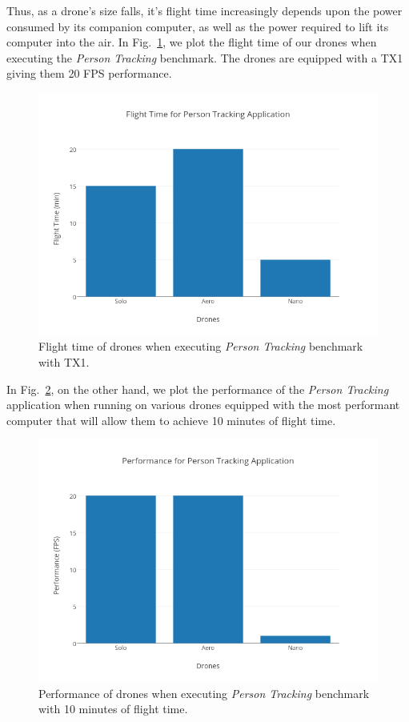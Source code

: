 Thus, as a drone's size falls, it's flight time increasingly depends upon the power consumed by its companion computer, as well as the power required to lift its computer into the air. In Fig.~\ref{fig:flight-time-tracking-tx1}, we plot the flight time of our drones when executing the \textit{Person Tracking} benchmark. The drones are equipped with a TX1 giving them 20 FPS performance.

\begin{figure}[h]
\centering
\includegraphics[width=\linewidth]{figs/flight-time-tracking-tx1}
\caption{Flight time of drones when executing \textit{Person Tracking} benchmark with TX1.}
\label{fig:flight-time-tracking-tx1}
\end{figure}

In Fig.~\ref{fig:perf-tracking-10min}, on the other hand, we plot the performance of the \textit{Person Tracking} application when running on various drones equipped with the most performant computer that will allow them to achieve 10 minutes of flight time.

\begin{figure}[h]
\centering
\includegraphics[width=\linewidth]{figs/perf-tracking-10min}
\caption{Performance of drones when executing \textit{Person Tracking} benchmark with 10 minutes of flight time.}
\label{fig:perf-tracking-10min}
\end{figure}

